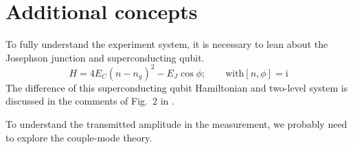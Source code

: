 \documentclass[12pt,notitlepage,nofootinbib]{revtex4-1}
\newcommand\mi{\mathrm{i}}
\begin{document}
\section{Additional concepts}
To fully understand the experiment system, it is necessary to lean about the 
Josephson junction and superconducting qubit. 
\begin{equation}
	H = 4E_C (n-n_g)^2 - E_J\cos\phi;\qquad \text{with} [n,\phi] = \mi
\end{equation}
The difference of this superconducting qubit Hamiltonian and two-level system 
is discussed in the comments of Fig.~2 in \cite{schuster2007resolving}. 

To understand the transmitted amplitude in the measurement, we probably need 
to explore the couple-mode theory. 


\end{document}
